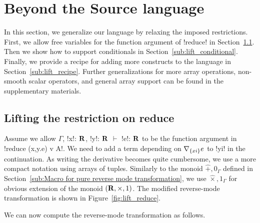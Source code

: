 \section{Beyond the Source language}
\label{sec:generalization}
In this section, we generalize our language by relaxing the imposed restrictions.
First, we allow free variables for the function argument of !reduce! in Section~\ref{sub:lift_reduce}. 
Then we show how to support conditionals in Section~\ref{sub:lift_conditional}.
Finally, we provide a recipe for adding more constructs to the language in Section~\ref{sub:lift_recipe}. Further generalizations for more array operations, non-smooth scalar operators, and general array support can be found in the supplementary materials.

\subsection{Lifting the restriction on reduce}
\label{sub:lift_reduce}

Assume we allow $\Gamma$, !x!: $\mathbf{R}$, !y!: $\mathbf{R}$ $\vdash$ !e!: $\mathbf{R}$ to be the function argument in
!reduce (x,y.e) v A!. We need to add a term depending on $\nabla_{\{xi\}}e$ to !yi! in the continuation.
As writing the derivative becomes quite cumbersome, we use a more compact notation using arrays of tuples. 
Similarly to the monoid $\widehat{+},0_\Gamma$ defined in Section~\ref{sub:Macro for pure reverse mode transformation},
we use $\widehat{\times},1_\Gamma$ for obvious extension of the monoid $(\mathbf{R},\times,1)$. The modified reverse-mode transformation is shown in Figure~\ref{fig:lift_reduce}.

We can now compute the reverse-mode transformation as follows.

